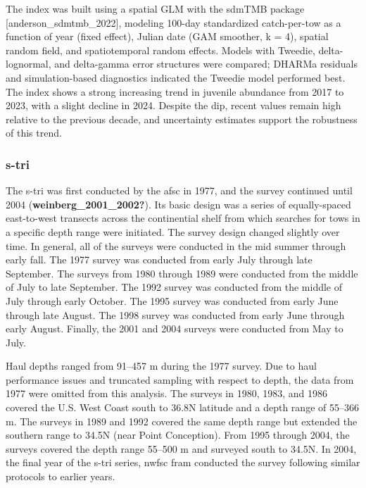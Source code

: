 \documentclass[
]{scrartcl}
\begin{document}
The index was built using a spatial GLM with the sdmTMB package
{[}anderson\_sdmtmb\_2022{]}, modeling 100-day standardized
catch-per-tow as a function of year (fixed effect), Julian date (GAM
smoother, k = 4), spatial random field, and spatiotemporal random
effects. Models with Tweedie, delta-lognormal, and delta-gamma error
structures were compared; DHARMa residuals and simulation-based
diagnostics indicated the Tweedie model performed best. The index shows
a strong increasing trend in juvenile abundance from 2017 to 2023, with
a slight decline in 2024. Despite the dip, recent values remain high
relative to the previous decade, and uncertainty estimates support the
robustness of this trend.

\subsubsection{\texorpdfstring{\acrlong{s-tri}}{}}\label{section-1}

The \gls{s-tri} was first conducted by the \gls{afsc} in 1977, and the
survey continued until 2004 (\textbf{weinberg\_2001\_2002?}). Its basic
design was a series of equally-spaced east-to-west transects across the
continential shelf from which searches for tows in a specific depth
range were initiated. The survey design changed slightly over time. In
general, all of the surveys were conducted in the mid summer through
early fall. The 1977 survey was conducted from early July through late
September. The surveys from 1980 through 1989 were conducted from the
middle of July to late September. The 1992 survey was conducted from the
middle of July through early October. The 1995 survey was conducted from
early June through late August. The 1998 survey was conducted from early
June through early August. Finally, the 2001 and 2004 surveys were
conducted from May to July.

Haul depths ranged from 91--457 m during the 1977 survey. Due to haul
performance issues and truncated sampling with respect to depth, the
data from 1977 were omitted from this analysis. The surveys in 1980,
1983, and 1986 covered the U.S. West Coast south to 36.8\textdegree N
latitude and a depth range of 55--366 m. The surveys in 1989 and 1992
covered the same depth range but extended the southern range to
34.5\textdegree N (near Point Conception). From 1995 through 2004, the
surveys covered the depth range 55--500 m and surveyed south to
34.5\textdegree N. In 2004, the final year of the \gls{s-tri} series,
\gls{nwfsc} \gls{fram} conducted the survey following similar protocols
to earlier years.
\end{document}
